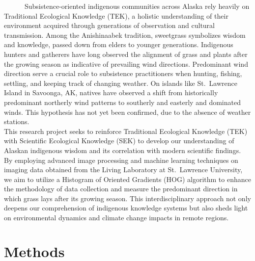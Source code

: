 \documentclass[
  letterpaper,
  DIV=11,
  numbers=noendperiod]{scrreprt}
\begin{document}
~~~~~~Subsistence-oriented indigenous communities across Alaska rely
heavily on Traditional Ecological Knowledge (TEK), a holistic
understanding of their environment acquired through generations of
observation and cultural transmission. Among the Anishinaabek tradition,
sweetgrass symbolizes wisdom and knowledge, passed down from elders to
younger generations. Indigenous hunters and gatherers have long observed
the alignment of grass and plants after the growing season as indicative
of prevailing wind directions. Predominant wind direction serve a
crucial role to subsistence practitioners when hunting, fishing,
settling, and keeping track of changing weather. On islands like
St.~Lawrence Island in Savoonga, AK, natives have observed a shift from
historically predominant northerly wind patterns to southerly and
easterly and dominated winds. This hypothesis has not yet been
confirmed, due to the absence of weather stations.\\
\hspace*{0.333em}\hspace*{0.333em}\hspace*{0.333em}\hspace*{0.333em}\hspace*{0.333em}\hspace*{0.333em}This
research project seeks to reinforce Traditional Ecological Knowledge
(TEK) with Scientific Ecological Knowledge (SEK) to develop our
understanding of Alaskan indigenous wisdom and its correlation with
modern scientific findings. By employing advanced image processing and
machine learning techniques on imaging data obtained from the Living
Laboratory at St.~Lawrence University, we aim to utilize a Histogram of
Oriented Gradients (HOG) algorithm to enhance the methodology of data
collection and measure the predominant direction in which grass lays
after its growing season. This interdisciplinary approach not only
deepens our comprehension of indigenous knowledge systems but also sheds
light on environmental dynamics and climate change impacts in remote
regions.


\hypertarget{methods}{%
\chapter{Methods}\label{methods}}
\end{document}
